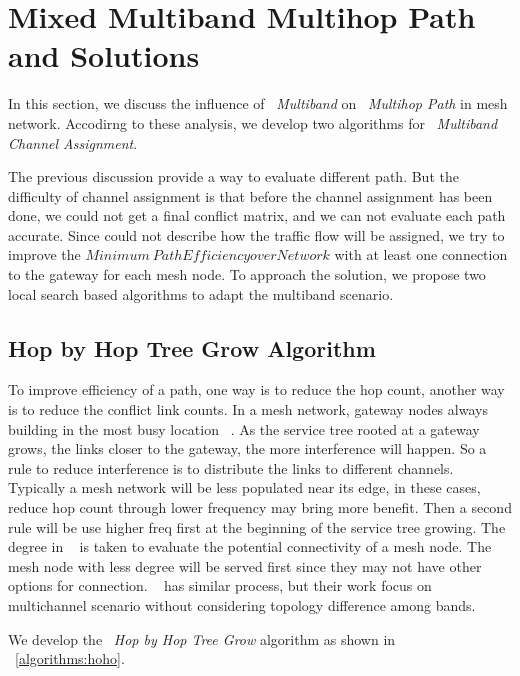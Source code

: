\section{Mixed Multiband Multihop Path and Solutions}
\label{sec:algorithms}


In this section, we discuss the influence of ~\emph{Multiband} on ~\emph{Multihop Path} in mesh network. 
Accodirng to these analysis, we develop two algorithms for ~\emph{Multiband Channel Assignment}.




The previous discussion provide a way to evaluate different path. But the difficulty of channel assignment is that before the channel assignment has been done, we could not get a final conflict matrix, and we can not evaluate each path accurate.
Since could not describe how the traffic flow will be assigned, we try to improve the $Minimum\ Path Efficiency over Network$ with at least one connection to the gateway for each mesh node.
To approach the solution, we propose two local search based algorithms to adapt the multiband scenario. 


\subsection{Hop by Hop Tree Grow Algorithm}
To improve efficiency of a path, one way is to reduce the hop count, another way is to reduce the conflict link counts.
In a mesh network, gateway nodes always building in the most busy location ~\cite{robinson2008adding, he2008optimizing}.
As the service tree rooted at a gateway grows, the links closer to the gateway, the more interference will happen.
So a rule to reduce interference is to distribute the links to different channels. Typically a mesh network will be less populated near its edge, in these cases, reduce hop count through lower frequency may bring more benefit. 
Then a second rule will be use higher freq first at the beginning of the service tree growing. The degree in ~\cite{he2008optimizing} is taken to evaluate the potential connectivity of a mesh node. 
The mesh node with less degree will be served first since they may not have other options for connection.
~\cite{ramachandran2006interference} has similar process, but their work focus on multichannel scenario without considering topology difference among bands.

   We develop the ~\emph{Hop by Hop Tree Grow} algorithm as shown in ~\ref{algorithms:hoho}.


